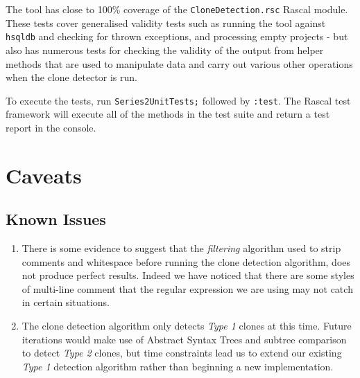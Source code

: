 \documentclass{article}
\begin{document}
The tool has close to 100\% coverage of the \texttt{CloneDetection.rsc} Rascal module. These tests cover generalised validity tests such as running the tool against \texttt{hsqldb} and checking for thrown exceptions, and processing empty projects - but also has numerous tests for checking the validity of the output from helper methods that are used to manipulate data and carry out various other operations when the clone detector is run.

To execute the tests, run \texttt{Series2UnitTests;} followed by \texttt{:test}. The Rascal test framework will execute all of the methods in the test suite and return a test report in the console.

\section{Caveats}
\subsection{Known Issues}

\begin{enumerate}
\item There is some evidence to suggest that the \textit{filtering} algorithm used to strip comments and whitespace before running the clone detection algorithm, does not produce perfect results. Indeed we have noticed that there are some styles of multi-line comment that the regular expression we are using may not catch in certain situations.
\item The clone detection algorithm only detects \textit{Type 1} clones at this time. Future iterations would make use of Abstract Syntax Trees and subtree comparison to detect \textit{Type 2} clones, but time constraints lead us to extend our existing \textit{Type 1} detection algorithm rather than beginning a new implementation.
\end{enumerate}

\newpage

\end{document}
